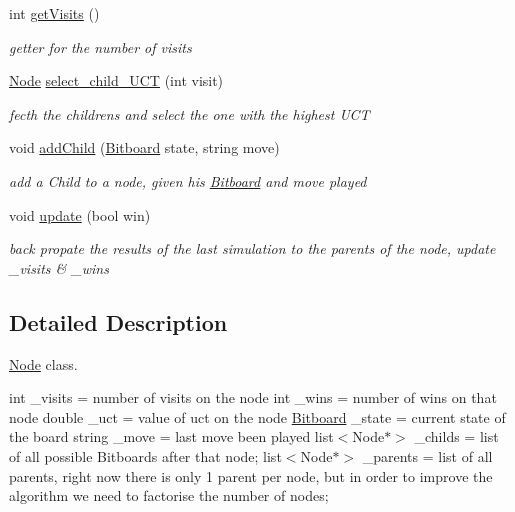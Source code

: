 \begin{DoxyCompactItemize}
int \hyperlink{classmcts_1_1_node_af93b8855df1ad7521b1b8a11ea21c410}{get\+Visits} ()
\begin{DoxyCompactList}\small\item\em getter for the number of visits \end{DoxyCompactList}\item 
\hyperlink{classmcts_1_1_node}{Node} \hyperlink{classmcts_1_1_node_ad4daedccf1e07591a0583252a7569037}{select\+\_\+child\+\_\+\+U\+C\+T} (int visit)
\begin{DoxyCompactList}\small\item\em fecth the childrens and select the one with the highest U\+C\+T \end{DoxyCompactList}\item 
void \hyperlink{classmcts_1_1_node_a8f4be3ce21227c042da6832491f9dcf7}{add\+Child} (\hyperlink{class_bitboard}{Bitboard} state, string move)
\begin{DoxyCompactList}\small\item\em add a Child to a node, given his \hyperlink{class_bitboard}{Bitboard} and move played \end{DoxyCompactList}\item 
void \hyperlink{classmcts_1_1_node_a57447b6e52620751c5ff5d791d857798}{update} (bool win)
\begin{DoxyCompactList}\small\item\em back propate the results of the last simulation to the parents of the node, update \+\_\+visits \& \+\_\+wins \end{DoxyCompactList}\end{DoxyCompactItemize}


\subsection{Detailed Description}
\hyperlink{classmcts_1_1_node}{Node} class. 

int \+\_\+visits = number of visits on the node int \+\_\+wins = number of wins on that node double \+\_\+uct = value of uct on the node \hyperlink{class_bitboard}{Bitboard} \+\_\+state = current state of the board string \+\_\+move = last move been played list$<$\+Node$\ast$$>$ \+\_\+childs = list of all possible Bitboards after that node; list$<$\+Node$\ast$$>$ \+\_\+parents = list of all parents, right now there is only 1 parent per node, but in order to improve the algorithm we need to factorise the number of nodes; 

